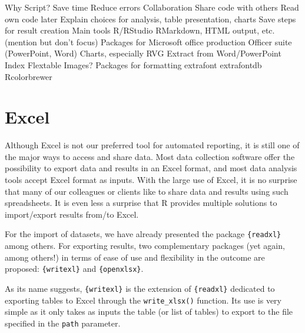 \documentclass[
]{book}
\begin{document}
Why Script?
Save time
Reduce errors
Collaboration
Share code with others
Read own code later
Explain choices for analysis, table presentation, charts
Save steps for result creation
Main tools
R/RStudio
RMarkdown, HTML output, etc. (mention but don't focus)
Packages for Microsoft office production
Officer suite (PowerPoint, Word)
Charts, especially RVG
Extract from Word/PowerPoint
Index
Flextable
Images?
Packages for formatting
extrafont
extrafontdb
Rcolorbrewer

\hypertarget{excel}{%
\section{Excel}\label{excel}}

Although Excel is not our preferred tool for automated reporting, it is still one of the major ways to access and share data. Most data collection software offer the possibility to export data and results in an Excel format, and most data analysis tools accept Excel format as inputs. With the large use of Excel, it is no surprise that many of our colleagues or clients like to share data and results using such spreadsheets. It is even less a surprise that R provides multiple solutions to import/export results from/to Excel.

For the import of datasets, we have already presented the package \texttt{\{readxl\}} among others. For exporting results, two complementary packages (yet again, among others!) in terms of ease of use and flexibility in the outcome are proposed: \texttt{\{writexl\}} and \texttt{\{openxlsx\}}.

As its name suggests, \texttt{\{writexl\}} is the extension of \texttt{\{readxl\}} dedicated to exporting tables to Excel through the \texttt{write\_xlsx()} function. Its use is very simple as it only takes as inputs the table (or list of tables) to export to the file specified in the \texttt{path} parameter.
\end{document}
